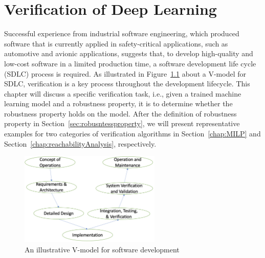 \chapter{Verification of Deep Learning}\label{chap:verificationchap}

Successful experience from industrial software engineering, which produced software that is currently applied in safety-critical applications, such as automotive and avionic applications, suggests that, to develop high-quality and low-cost software in a limited production time, a software development life cycle (SDLC) process is required. As illustrated in Figure~\ref{fig:oldVmodel} about a V-model for SDLC, verification is a key process throughout the development lifecycle.   This chapter will discuss a specific verification task, i.e., given a trained machine learning model and a robustness property, it is to determine whether the robustness property holds on the model. After the definition of robustness property in Section~\ref{sec:robusntessproperty}, we will present representative examples for two categories of verification algorithms in Section~\ref{chap:MILP} and Section~\ref{chap:reachabilityAnalysis}, respectively. 
%
\begin{figure}[!htbp]
    \centering
    \includegraphics[width=0.6\textwidth]{images/robustnessVerification/oldVmodel.png}
    \caption{An illustrative V-model for software development}
    \label{fig:oldVmodel}
\end{figure}
%



